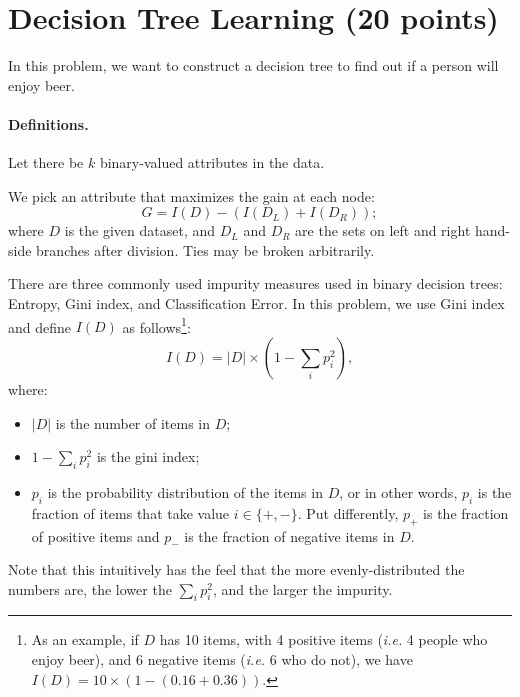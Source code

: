 \section{Decision Tree Learning (20 points)}
 
In this problem, we want to construct a decision tree to find out if a person will enjoy beer.

\paragraph{Definitions.} Let there be $k$ binary-valued attributes in the data. 

We pick an attribute that maximizes the gain at each node:
\begin{equation}\label{G}
	G = I(D) - (I(D_L) + I(D_R));
\end{equation}
where $D$ is the given dataset, and $D_L$ and $D_R$ are the sets on left and right hand-side branches after division. Ties may be broken arbitrarily. 

There are three commonly used impurity measures used in binary decision trees: Entropy, Gini index, and Classification Error. In this problem, we use Gini index and define $I(D)$ as follows\footnote{As an example, if $D$ has 10 items, with 4 positive items (\emph{i.e.} 4 people who enjoy beer), and 6 negative items (\emph{i.e.} 6 who do not), we have $I(D) = 10 \times (1 - (0.16 + 0.36))$.}:
\[
	I(D) = |D| \times \left(1-\sum_i p_i^2\right),
\]
where:
\begin{itemize}
	\item $|D|$ is the number of items in $D$;
	\item $1 - \sum_i p_i^2$ is the gini index;
	\item $p_i$ is the probability distribution of the items in $D$, or in other words, $p_i$ is the fraction of items that take value $i\in\{+,-\}$. Put differently, $p_+$ is the fraction of positive items and $p_-$ is the fraction of negative items in $D$.
\end{itemize}

Note that this intuitively has the feel that the more evenly-distributed the numbers are, the lower the $\sum_i p_i^2$, and the larger the impurity.

